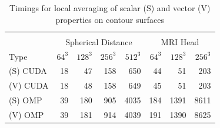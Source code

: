 \documentclass[review,journal]{vgtc}         %
\begin{document}
\begin{table}[tb!]
\begin{center}
\caption{Timings for local averaging of scalar (S) and vector (V) properties on contour surfaces}
\label{tab:timingsaverage}
\begin{tabular}{l|r r r r|r r r}
\multicolumn{8}{c}{ } \\
& \multicolumn{4}{|c|}{Spherical Distance} & \multicolumn{3}{|c}{MRI Head}\\
Type & $64^3$ & $128^3$ & $256^3$ & $512^3$ & $64^3$ & $128^3$ & $256^3$\\
\hline
(S) CUDA & 18 & 47 & 158 & 650 & 44 & 51 & 203 \\
(V) CUDA & 18 & 48 & 158 & 649 & 45 & 51 & 203 \\
(S) OMP & 39 & 180 & 905 & 4035 & 184 & 1391 & 8611 \\
(V) OMP & 39 & 181 & 914 & 4039 & 191 & 1390 & 8625 \\
\end{tabular}
\end{center}
\end{table}
\end{document}
